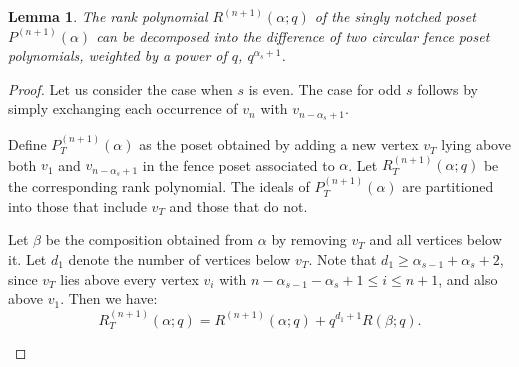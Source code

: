 \documentclass{article}
\newtheorem{lemma}{Lemma}
\theoremstyle{remark}
\begin{document}
\begin{lemma}\label{lem:eq1}
    The rank polynomial $R^{(n+1)}(\alpha; q)$ of the singly notched poset $P^{(n+1)}(\alpha)$ can be decomposed into the difference of two circular fence poset polynomials, weighted by a power of $q$, $q^{\alpha_s+1}$.
\end{lemma}
\begin{proof}
Let us consider the case when \( s \) is even. The case for odd \( s \) follows by simply exchanging each occurrence of \( v_n \) with \( v_{n - \alpha_s + 1} \).

Define \( P_T^{(n+1)}(\alpha) \) as the poset obtained by adding a new vertex \( v_T \) lying above both \( v_1 \) and \( v_{n - \alpha_s + 1} \) in the fence poset associated to \( \alpha \). Let \( R_T^{(n+1)}(\alpha; q) \) be the corresponding rank polynomial. The ideals of \( P_T^{(n+1)}(\alpha) \) are partitioned into those that include \( v_T \) and those that do not.

Let \( \beta \) be the composition obtained from \( \alpha \) by removing \( v_T \) and all vertices below it. Let \( d_1 \) denote the number of vertices below \( v_T \). Note that \( d_1 \geq \alpha_{s-1} + \alpha_s + 2 \), since \( v_T \) lies above every vertex \( v_i \) with \( n - \alpha_{s-1} - \alpha_s + 1 \leq i \leq n+1 \), and also above \( v_1 \). Then we have:
\[
R_T^{(n+1)}(\alpha; q) = R^{(n+1)}(\alpha; q) + q^{d_1 + 1} R(\beta; q).
\]

\begin{figure}[H]
    \centering
\end{figure}
\end{proof}
\end{document}
